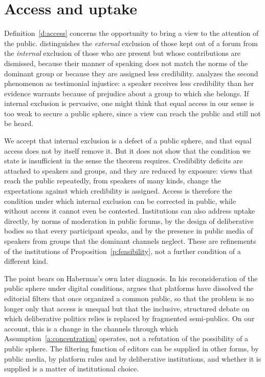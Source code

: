 \documentclass{situationist-preprint}
\begin{document}
\section{Access and uptake}

Definition~\ref{d:access} concerns the opportunity to bring a view to the attention of the public. \citet{Young2000} distinguishes the \emph{external} exclusion of those kept out of a forum from the \emph{internal} exclusion of those who are present but whose contributions are dismissed, because their manner of speaking does not match the norms of the dominant group or because they are assigned less credibility. \citet{Fricker2007} analyzes the second phenomenon as testimonial injustice: a speaker receives less credibility than her evidence warrants because of prejudice about a group to which she belongs. If internal exclusion is pervasive, one might think that equal access in our sense is too weak to secure a public sphere, since a view can reach the public and still not be heard.

We accept that internal exclusion is a defect of a public sphere, and that equal access does not by itself remove it. But it does not show that the condition we state is insufficient in the sense the theorem requires. Credibility deficits are attached to speakers and groups, and they are reduced by exposure: views that reach the public repeatedly, from speakers of many kinds, change the expectations against which credibility is assigned. Access is therefore the condition under which internal exclusion can be corrected in public, while without access it cannot even be contested. Institutions can also address uptake directly, by norms of moderation in public forums, by the design of deliberative bodies so that every participant speaks, and by the presence in public media of speakers from groups that the dominant channels neglect. These are refinements of the institutions of Proposition~\ref{p:feasibility}, not a further condition of a different kind.

The point bears on Habermas's own later diagnosis. In his reconsideration of the public sphere under digital conditions, \citet{Habermas2023} argues that platforms have dissolved the editorial filters that once organized a common public, so that the problem is no longer only that access is unequal but that the inclusive, structured debate on which deliberative politics relies is replaced by fragmented semi-publics. On our account, this is a change in the channels through which Assumption~\ref{a:concentration} operates, not a refutation of the possibility of a public sphere. The filtering function of editors can be supplied in other forms, by public media, by platform rules and by deliberative institutions, and whether it is supplied is a matter of institutional choice.
\end{document}
